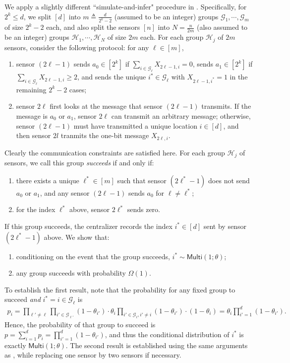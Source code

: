 \documentclass[final,12pt]{colt2018} %
\newcommand{\calG}{{\mathcal{G}}}
\newcommand{\calH}{{\mathcal{H}}}
\begin{document}
We apply a slightly different ``simulate-and-infer" procedure in \cite{acharya2018distributed}. Specifically, for $2^k\le d$, we split $[d]$ into $m\triangleq \frac{d}{2^k-2}$ (assumed to be an integer) groups $\calG_1,\cdots,\calG_m$ of size $2^k-2$ each, and also split the sensors $[n]$ into $N=\frac{n}{2m}$ (also assumed to be an integer) groups $\calH_1,\cdots,\calH_N$ of size $2m$ each. For each group $\calH_j$ of $2m$ sensors, consider the following protocol: for any $\ell \in [m]$, 
\begin{enumerate}
	\item sensor $(2\ell -1)$ sends $a_0\in [2^k]$ if $\sum_{i\in\calG_\ell} X_{2\ell-1,i}=0$, sends $a_1\in [2^k]$ if $\sum_{i\in\calG_\ell} X_{2\ell-1,i}\ge 2$, and sends the unique $i^*\in \calG_\ell$ with $X_{2\ell-1,i^*}=1$ in the remaining $2^k-2$ cases; 
	\item sensor $2\ell$ first looks at the message that sensor $(2\ell-1)$ transmits. If the message is $a_0$ or $a_1$, sensor $2\ell$ can transmit an arbitrary message; otherwise, sensor $(2\ell-1)$ must have transmitted a unique location $i\in [d]$, and then sensor $2l$ tranmits the one-bit message $X_{2\ell,i}$. 
\end{enumerate}

Clearly the communication constraints are satisfied here. For each group $\calH_j$ of sensors, we call this group \emph{succeeds} if and only if: 
\begin{enumerate}
	\item there exists a unique $\ell^*\in [m]$ such that sensor $(2\ell^*-1)$ does not send $a_0$ or $a_1$, and any sensor $(2\ell-1)$ sends $a_0$ for $\ell\neq \ell^*$; 
	\item for the index $\ell^*$ above, sensor $2\ell^*$ sends zero. 
\end{enumerate}
If this group succeeds, the centralizer records the index $i^*\in [d]$ sent by sensor $(2\ell^*-1)$ above. We show that: 
\begin{enumerate}
	\item conditioning on the event that the group succeeds, $i^*\sim \mathsf{Multi}(1; \theta)$; 
	\item any group succeeds with probability $\Omega(1)$. 
\end{enumerate}

To establish the first result, note that the probability for any fixed group to succeed \emph{and} $i^*=i\in \calG_\ell$ is
\begin{align*}
p_i = \prod_{\ell' \neq \ell} \prod_{i'\in \calG_{\ell'} } (1-\theta_{i'})\cdot \theta_i\prod_{i'\in \calG_\ell, i'\neq i} (1-\theta_{i'})\cdot (1-\theta_i) = \theta_i \prod_{i'=1}^d (1-\theta_{i'}).
\end{align*}
Hence, the probability of that group to succeed is $p = \sum_{i=1}^d p_i=\prod_{i'=1}^d (1-\theta_{i'})$, and thus the conditional distribution of $i^*$ is exactly $\mathsf{Multi}(1; \theta)$. The second result is established using the same arguments as \cite[Theorem 4.7]{acharya2018distributed}, while replacing one sensor by two sensors if necessary. 
\end{document}
